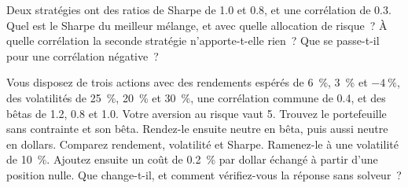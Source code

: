 \begin{question}\label{iq:iv2:portfolio-construction:24}
Deux stratégies ont des ratios de Sharpe de 1.0 et 0.8, et une corrélation de 0.3. Quel est le Sharpe du meilleur mélange, et avec quelle allocation de risque~? À quelle corrélation la seconde stratégie n'apporte-t-elle rien~? Que se passe-t-il pour une corrélation négative~?
\end{question}

\begin{question}\label{iq:iv2:portfolio-construction:25}
Vous disposez de trois actions avec des rendements espérés de 6~\%, 3~\% et $-4~\%$, des volatilités de 25~\%, 20~\% et 30~\%, une corrélation commune de 0.4, et des bêtas de 1.2, 0.8 et 1.0. Votre aversion au risque vaut 5. Trouvez le portefeuille sans contrainte et son bêta. Rendez-le ensuite neutre en bêta, puis aussi neutre en dollars. Comparez rendement, volatilité et Sharpe. Ramenez-le à une volatilité de 10~\%. Ajoutez ensuite un coût de 0.2~\% par dollar échangé à partir d'une position nulle. Que change-t-il, et comment vérifiez-vous la réponse sans solveur~?
\end{question}
